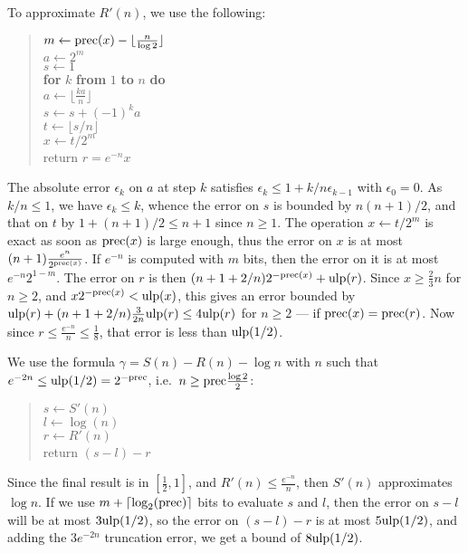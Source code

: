 \documentclass[12pt]{amsart}
\def\q{\hspace*{5mm}}
\def\ulp{{\rm ulp}}
\def\Paragraph#1{\noindent {\sc #1}}
\begin{document}
To approximate $R'(n)$, we use the following:
\begin{quote}
$m \leftarrow {\rm prec}(x) - \lfloor \frac{n}{\log 2} \rfloor$ \\
$a \leftarrow 2^m$ \\
$s \leftarrow 1$ \\
{\bf for} $k$ {\bf from} $1$ {\bf to} $n$ {\bf do} \\
\q $a \leftarrow \lfloor \frac{k a}{n} \rfloor$ \\
\q $s \leftarrow s + (-1)^{k} a$ \\
$t \leftarrow \lfloor s/n \rfloor$ \\
$x \leftarrow t/2^m$ \\
return $r = e^{-n} x$
\end{quote}
The absolute error $\epsilon_k$ on $a$ at step $k$ satisfies
$\epsilon_k \le 1 + k/n \epsilon_{k-1}$ with $\epsilon_0=0$.
As $k/n \le 1$, we have $\epsilon_k \le k$, whence the error
on $s$ is bounded by $n(n+1)/2$, and that on $t$ by 
$1 + (n+1)/2 \le n+1$ since $n \ge 1$.
The operation $x \leftarrow t/2^m$ is exact as soon as ${\rm prec}(x)$ is large
enough, thus the error on $x$ is at most $(n+1) \frac{e^n}{2^{{\rm prec}(x)}}$.
If $e^{-n}$ is computed with $m$ bits, then
the error on it is at most $e^{-n} 2^{1-m}$.
The error on $r$ is then $(n + 1 + 2/n) 2^{-{\rm prec}(x)} +
\ulp(r)$.
Since $x \ge \frac{2}{3} n$ for $n \ge 2$, and $x 2^{-{\rm prec}(x)}
< \ulp(x)$, this gives an error bounded by 
$\ulp(r) + (n + 1 + 2/n) \frac{3}{2n} \ulp(r)
\le 4 \ulp(r)$ for $n \ge 2$ --- if ${\rm prec}(x) = {\rm prec}(r)$.
Now since $r \le \frac{e^{-n}}{n} \le \frac{1}{8}$, that error
is less than $\ulp(1/2)$.

\Paragraph{Final computation.} We use the formula
$\gamma = S(n) - R(n) - \log n$ with $n$ such that $e^{-2n} \le 
\ulp(1/2) = 2^{-{\rm prec}}$, i.e.~$n \ge {\rm prec} \frac{\log 2}{2}$:
\begin{quote}
$s \leftarrow S'(n)$ \\
$l \leftarrow \log(n)$ \\
$r \leftarrow R'(n)$ \\
return $(s - l) - r$
\end{quote}
Since the final result is in $[\frac{1}{2}, 1]$, and $R'(n) \le 
\frac{e^{-n}}{n}$, then $S'(n)$ approximates $\log n$.
If we use $m + \lceil \log_2({\rm prec}) \rceil$ bits to evaluate $s$ and $l$,
then the error on $s-l$ will be at most $3 \ulp(1/2)$,
so the error on $(s - l) - r$ is at most $5 \ulp(1/2)$,
and adding the $3 e^{-2n}$ truncation error, we get a bound of
$8 \ulp(1/2)$.
\end{document}
